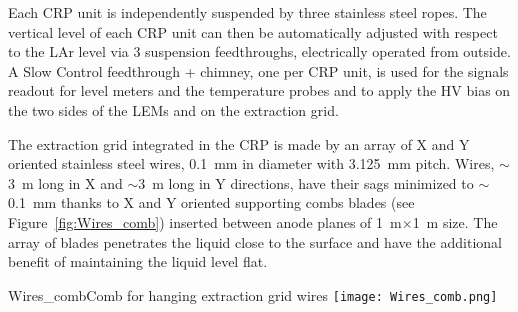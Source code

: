 Each CRP unit is independently suspended by three stainless steel
ropes. The vertical level of each CRP unit can then be automatically
adjusted with respect to the LAr level via 3 suspension feedthroughs,
electrically operated from outside. A Slow Control feedthrough +
chimney, one per CRP unit, is used for the signals readout for level
meters and the temperature probes and to apply the HV bias on the two
sides of the LEMs and on the extraction grid.

The extraction grid integrated in the CRP is made by an array of X and
Y oriented stainless steel wires, 0.1~mm in diameter with 3.125~mm
pitch.  Wires, $\sim$3~m long in X and $\sim$3~m long in Y directions,
have their sags minimized to $\sim$0.1~mm thanks to X and Y oriented
supporting combs blades (see Figure~\ref{fig:Wires_comb}) inserted
between anode planes of 1~m$\times$1~m size. The array of blades
penetrates the liquid close to the surface and have the additional
benefit of maintaining the liquid level flat.
\begin{cdrfigure}{Wires_comb}{Comb for hanging extraction grid wires}
\texttt{[image: Wires\_comb.png]}
\end{cdrfigure}


